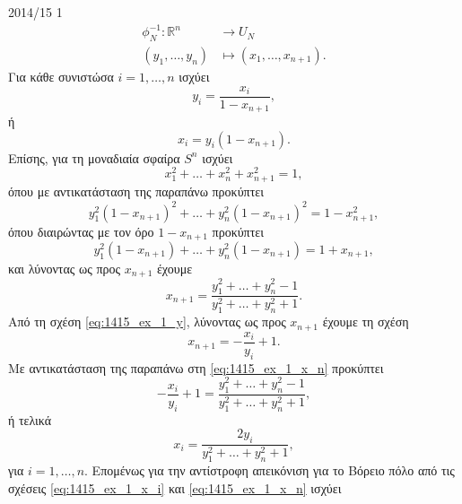 \documentclass[a4paper,11pt]{article}
\begin{document}
\begin{solution}{2014/15 1}
    \begin{align*}
        \phi_N^{-1}: \mathbb{R}^n &\to U_N \\
        (y_1, \dots, y_n) &\mapsto (x_1, \dots, x_{n+1}).
    \end{align*}
    Για κάθε συνιστώσα \( i = 1, \dots, n \) ισχύει
    \begin{equation}\label{eq:1415_ex_1_y}
        y_i = \dfrac{x_i}{1- x_{n+1}},
    \end{equation}
    ή
    \begin{equation*}
        x_i = y_i(1- x_{n+1}).
    \end{equation*}
    Επίσης, για τη μοναδιαία σφαίρα \( S^n \) ισχύει
    \begin{equation*}
        x_1^2 + \dots + x_n^2 + x_{n+1}^2 = 1,
    \end{equation*}
    όπου με αντικατάσταση της παραπάνω προκύπτει
    \begin{equation*}
        y_1^2(1 - x_{n+1})^2 + \dots + y_n^2(1 - x_{n+1})^2 = 1 - x^2_{n+1},
    \end{equation*}
    όπου διαιρώντας με τον όρο \( 1 - x_{n+1} \) προκύπτει
    \begin{equation*}
        y_1^2(1 - x_{n+1}) + \dots + y_n^2(1 - x_{n+1}) = 1 + x_{n+1},
    \end{equation*}
    και λύνοντας ως προς \( x_{n+1} \) έχουμε
    \begin{equation}\label{eq:1415_ex_1_x_n}
        x_{n+1} = \dfrac{y_1^2 + \dots + y_n^2 - 1}{y_1^2 + \dots + y_n^2 + 1}.
    \end{equation}
    Από τη σχέση \eqref{eq:1415_ex_1_y}, λύνοντας ως προς \( x_{n+1} \) έχουμε
    τη σχέση
    \begin{equation*}
        x_{n+1} = - \dfrac{x_i}{y_i} + 1.
    \end{equation*}
    Με αντικατάσταση της παραπάνω στη \eqref{eq:1415_ex_1_x_n} προκύπτει
    \begin{equation*}
        - \dfrac{x_i}{y_i} + 1 = \dfrac{y_1^2 + \dots + y_n^2 - 1}{y_1^2 + \dots
        + y_n^2 + 1},
    \end{equation*}
    ή τελικά
    \begin{equation}\label{eq:1415_ex_1_x_i}
        x_i = \dfrac{2y_i}{y_1^2 + \dots + y_n^2 + 1},
    \end{equation}
    για \( i = 1, \dots, n \). Επομένως για την αντίστροφη απεικόνιση για το
    Βόρειο πόλο από τις σχέσεις \eqref{eq:1415_ex_1_x_i} και
    \eqref{eq:1415_ex_1_x_n} ισχύει
    \begin{align*}

\end{align*}
\end{solution}
\end{document}
